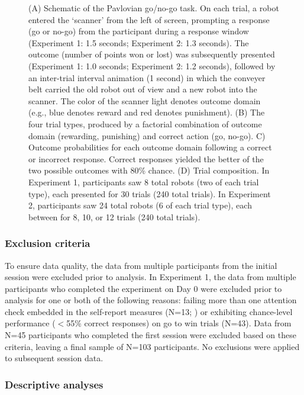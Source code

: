 \documentclass[a4paper,12pt]{article}
\begin{document}
\begin{refsection}[main]
\begin{figure}[t]
    \centerline{}
    \caption{(A) Schematic of the Pavlovian go/no-go task. On each trial, a robot entered the `scanner' from the left of screen, prompting a response (go or no-go) from the participant during a response window (Experiment 1: 1.5 seconds; Experiment 2: 1.3 seconds). The outcome (number of points won or lost) was subsequently presented (Experiment 1: 1.0 seconds; Experiment 2: 1.2 seconds), followed by an inter-trial interval animation (1 second) in which the conveyer belt carried the old robot out of view and a new robot into the scanner. The color of the scanner light denotes outcome domain (e.g., blue denotes reward and red denotes punishment). (B) The four trial types, produced by a factorial combination of outcome domain (rewarding, punishing) and correct action (go, no-go). C) Outcome probabilities for each outcome domain following a correct or incorrect response. Correct responses yielded the better of the two possible outcomes with 80\% chance. (D) Trial composition. In Experiment 1, participants saw 8 total robots (two of each trial type), each presented for 30 trials (240 total trials). In Experiment 2, participants saw 24 total robots (6 of each trial type), each between for 8, 10, or 12 trials (240 total trials).}
    \label{fig:task_schematic}
\end{figure}

\subsubsection*{Exclusion criteria}

To ensure data quality, the data from multiple participants from the initial session were excluded prior to analysis. In Experiment 1, the data from multiple participants who completed the experiment on Day 0 were excluded prior to analysis for one or both of the following reasons: failing more than one attention check embedded in the self-report measures (N=13; \cite{zorowitz2023inattentive}) or exhibiting chance-level performance ($<$55\% correct responses) on go to win trials (N=43). Data from N=45 participants who completed the first session were excluded based on these criteria, leaving a final sample of N=103 participants. No exclusions were applied to subsequent session data. 

\subsubsection*{Descriptive analyses}


\end{refsection}
\end{document}
